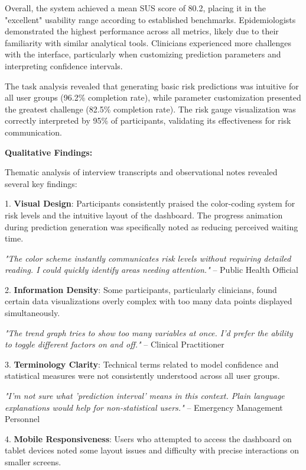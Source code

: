\documentclass[12pt,a4paper]{report}
\begin{document}
Overall, the system achieved a mean SUS score of 80.2, placing it in the "excellent" usability range according to established benchmarks. Epidemiologists demonstrated the highest performance across all metrics, likely due to their familiarity with similar analytical tools. Clinicians experienced more challenges with the interface, particularly when customizing prediction parameters and interpreting confidence intervals.

The task analysis revealed that generating basic risk predictions was intuitive for all user groups (96.2\% completion rate), while parameter customization presented the greatest challenge (82.5\% completion rate). The risk gauge visualization was correctly interpreted by 95\% of participants, validating its effectiveness for risk communication.

\textbf{Qualitative Findings:}

Thematic analysis of interview transcripts and observational notes revealed several key findings:

1. \textbf{Visual Design}: Participants consistently praised the color-coding system for risk levels and the intuitive layout of the dashboard. The progress animation during prediction generation was specifically noted as reducing perceived waiting time.

   \textit{"The color scheme instantly communicates risk levels without requiring detailed reading. I could quickly identify areas needing attention."} – Public Health Official

2. \textbf{Information Density}: Some participants, particularly clinicians, found certain data visualizations overly complex with too many data points displayed simultaneously.

   \textit{"The trend graph tries to show too many variables at once. I'd prefer the ability to toggle different factors on and off."} – Clinical Practitioner

3. \textbf{Terminology Clarity}: Technical terms related to model confidence and statistical measures were not consistently understood across all user groups.

   \textit{"I'm not sure what 'prediction interval' means in this context. Plain language explanations would help for non-statistical users."} – Emergency Management Personnel

4. \textbf{Mobile Responsiveness}: Users who attempted to access the dashboard on tablet devices noted some layout issues and difficulty with precise interactions on smaller screens.
\end{document}
